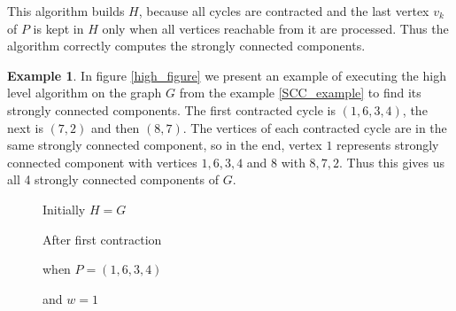 \documentclass{report}
\theoremstyle{plain}
\theoremstyle{definition}
\newtheorem{example}{Example}
\theoremstyle{remark}
\numberwithin{definition}{chapter}
\numberwithin{example}{chapter}
\numberwithin{figure}{chapter}
\numberwithin{theorem}{chapter}
\numberwithin{lemma}{chapter}
\begin{document}
This algorithm builds $H$, because all cycles are contracted and the last vertex $v_k$ of $P$ is kept in $H$ only when all vertices reachable from it are processed. Thus the algorithm correctly computes the strongly connected components.

\begin{example}

In figure \ref{high_figure} we present an example of executing the high level algorithm on the graph $G$ from the example \ref{SCC_example} to find its strongly connected components. The first contracted cycle is $(1,6,3,4)$, the next is $(7,2)$ and then $(8,7)$. The vertices of each contracted cycle are in the same strongly connected component, so in the end, vertex $1$ represents strongly connected component with vertices $1,6,3,4$ and $8$ with $8,7,2$. Thus this gives us all 4 strongly connected components of $G$.

\begin{figure}[h]
\center

\begin{minipage}[h]{0.24\textwidth}

Initially $H=G$
\end{minipage}
\hfill
{}

After first contraction

when $P=(1,6,3,4)$

and $w=1$
\endminipage\hfill
{}


\end{figure}
\end{example}
\end{document}
